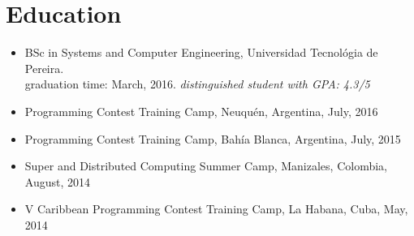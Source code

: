 \documentclass[11pt,a4paper,sans]{moderncv}        %
\begin{document}
\section{Education}
\begin{itemize}
  \item{BSc in Systems and Computer Engineering, Universidad Tecnológia de Pereira. \\ graduation time: March, 2016. \textit{distinguished student with GPA: 4.3/5}}
  \item{Programming Contest Training Camp, Neuquén, Argentina, July, 2016}
  \item{Programming Contest Training Camp, Bahía Blanca, Argentina, July, 2015}
  \item{Super and Distributed Computing Summer Camp,  Manizales, Colombia, August, 2014}
  \item{V Caribbean Programming Contest Training Camp, La Habana, Cuba, May, 2014}
\end{itemize}



\end{document}
